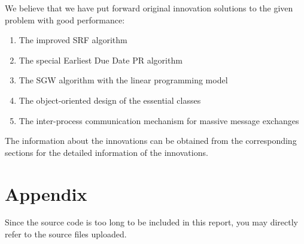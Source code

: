 \documentclass[a4paper, 12pt]{article}
\begin{document}
We believe that we have put forward original innovation solutions to the given problem with good performance:

\begin{enumerate}
    \item The improved SRF algorithm
    \item The special Earliest Due Date PR algorithm
    \item The SGW algorithm with the linear programming model
    \item The object-oriented design of the essential classes
    \item The inter-process communication mechanism for massive message exchanges
\end{enumerate}

The information about the innovations can be obtained from the corresponding sections for the detailed information of the innovations.

\section{Appendix}

Since the source code is too long to be included in this report, you may directly refer to the source files uploaded.
\end{document}
